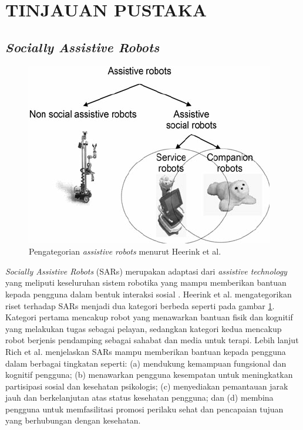 \section{TINJAUAN PUSTAKA}

\subsection{\emph{Socially Assistive Robots}}

\begin{figure} [ht] \centering
	\includegraphics[scale=0.45]{gambar/robots-category.png}
	\caption{Pengategorian \emph{assistive robots} menurut Heerink et al. \citep{Heerink2010}}
	\label{fig:RobotsCategory}
\end{figure}

\emph{Socially Assistive Robots} (SARs) merupakan adaptasi dari \emph{assistive technology} yang meliputi keseluruhan sistem robotika yang mampu memberikan bantuan kepada pengguna dalam bentuk interaksi sosial \citep{Seifer2005}.
Heerink et al. \citep{Heerink2010} mengategorikan riset terhadap SARs menjadi dua kategori berbeda seperti pada gambar \ref{fig:RobotsCategory}.
Kategori pertama mencakup robot yang menawarkan bantuan fisik dan kognitif yang melakukan tugas sebagai pelayan, sedangkan kategori kedua mencakup robot berjenis pendamping sebagai sahabat dan media untuk terapi.
Lebih lanjut Rich et al. \citep{Rich2009} menjelaskan SARs mampu memberikan bantuan kepada pengguna dalam berbagai tingkatan seperti:
(a) mendukung kemampuan fungsional dan kognitif pengguna;
(b) menawarkan pengguna kesempatan untuk meningkatkan partisipasi sosial dan kesehatan psikologis;
(c) menyediakan pemantauan jarak jauh dan berkelanjutan atas status kesehatan pengguna;
dan (d) membina pengguna untuk memfasilitasi promosi perilaku sehat dan pencapaian tujuan yang berhubungan dengan kesehatan.

